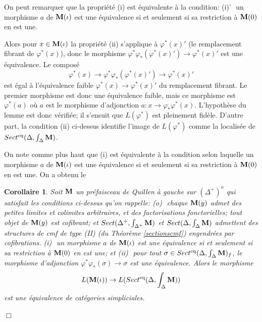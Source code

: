 \documentclass[12pt]{article}
\newcommand{\eop}{\hfill $\Box$\vspace{.1in}}
\newtheorem{corollaire}[lemma]{Corollaire}
\newcommand{\mm}{{\bf M}}
\begin{document}
On peut remarquer que la propri\'et\'e (i) est \'equivalente
\`a la condition:
\newline
(i)'\,\, un morphisme $a$ de $\mm (\iota )$ est
une \'equivalence si et seulement si
sa restriction \`a $\mm (0)$ en est une.

Alors pour $x\in \mm (\iota )$ la propri\'et\'e (ii) s'applique \`a
$\varphi ^{\ast} (x)'$
(le remplacement fibrant de $\varphi ^{\ast} (x)$),
donc le morphisme
$\varphi ^{\ast} \varphi _{\ast} (\varphi ^{\ast} (x)')\rightarrow \varphi
^{\ast} (x)'$ est une \'equivalence. Le
compos\'e
$$
\varphi ^{\ast} (x)\rightarrow \varphi ^{\ast}
 \varphi _{\ast} (\varphi ^{\ast} (x)') \rightarrow \varphi ^{\ast} (x)'
$$
est \'egal \`a l'\'equivalence faible $\varphi ^{\ast} (x)\rightarrow
\varphi ^{\ast} (x)'$ du
remplacement fibrant. Le premier morphisme est donc une \'equivalence faible,
mais ce morphisme est $\varphi ^{\ast} (a)$ o\`u $a$ est le morphisme
d'adjonction
$a:x\rightarrow \varphi _{\ast} \varphi ^{\ast} (x)$. L'hypoth\`ese du lemme
est donc v\'erifi\'ee; il s'ensuit que
$L(\varphi ^{\ast} )$ est pleinement fid\`ele. D'autre part,
la condition (ii)
ci-dessus
identifie l'image de $L(\varphi ^{\ast} )$ comme la localis\'ee de  $Sect
^{\rm eq} (\Delta
, \int _{\Delta} \mm )$.

On note comme plus haut que (i) est \'equivalente \`a la condition
selon laquelle
un morphisme $a$ de $\mm (\iota )$ est une \'equivalence
si et seulement si sa restriction \`a $\mm (0)$ en est une.
On a obtenu le

\begin{corollaire}
\label{dpq2}
Soit $\mm$ un pr\'efaisceau de Quillen \`a gauche sur $(\Delta ^+)^o$
qui satisfait les conditions ci-dessus qu'on rappelle:
\newline
(o)\,\, chaque $\mm (y)$ admet des petites limites et colimites
arbitraires, et des factorisations fonctorielles;
tout objet de $\mm (y)$ est cofibrant; et $Sect (\Delta ^+, \int
_{\Delta ^+}\mm )$ et $Sect (\Delta , \int _{\Delta} \mm )$ admettent des
structures de cmf de type (II) (du
Th\'eor\`eme \ref{sectionscmf}) engendr\'ees par
cofibrations.
\newline
(i)\,\, un morphisme $a$ de $\mm (\iota )$ est une \'equivalence
si et seulement si sa restriction \`a $\mm (0)$ en est une; et
\newline
(ii)\,\, pour tout $\sigma \in Sect ^{\rm eq} (\Delta , \int _{\Delta} \mm )_f$,
le morphisme d'adjonction $\varphi ^{\ast} \varphi _{\ast} (\sigma )
\rightarrow \sigma$
est une \'equivalence.
\newline
Alors le morphisme
$$
L(\mm (\iota ))\rightarrow
L(Sect ^{\rm eq} (\Delta , \int _{\Delta} \mm ))
$$
est une \'equivalence de cat\'egories simpliciales.
\end{corollaire}
\eop
\end{document}
